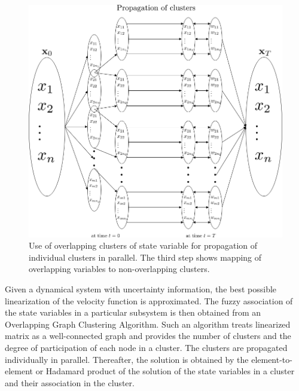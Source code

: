 \begin{figure}[H]
\centering
\includegraphics[scale=0.5]{figures_2/clusters_2}
\caption{Use of overlapping clusters of state variable for propagation of individual clusters in parallel. The third step shows mapping of overlapping variables to non-overlapping clusters.}
\label{clusters_2}
\end{figure}

Given a dynamical system with uncertainty information, the best possible linearization of the velocity function is approximated. The fuzzy association of the state variables in a particular subsystem is then obtained from an Overlapping Graph Clustering Algorithm. Such an algorithm treats linearized matrix as a well-connected graph and provides the number of clusters and the degree of participation of each node in a cluster. The clusters are propagated individually in parallel. Thereafter, the solution is obtained by the element-to-element or Hadamard product of the solution of the state variables in a cluster and their association in the cluster. 

